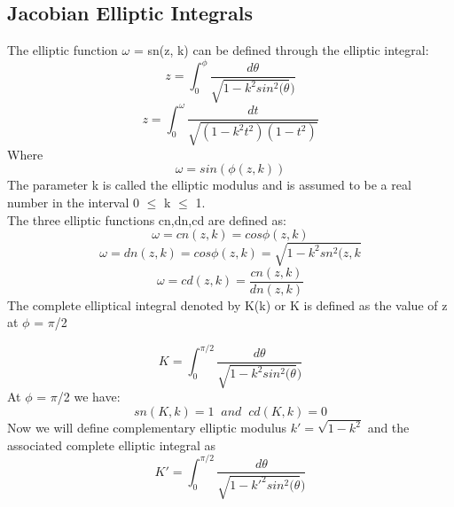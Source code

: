 \documentclass[12pt]{article}
\begin{document}
\subsection{\textbf{Jacobian Elliptic Integrals}}
The elliptic function $\omega$ = sn(z, k) can be defined through the elliptic integral:
\begin{equation*}
    z =  \int_{0}^{\phi} \frac{d\theta}{\sqrt{1-k^2sin^2(\theta})}
   
\end{equation*}
\begin{equation*}
     z =\int_{0}^{\omega} \frac{dt}{\sqrt{(1-k^2t^2)(1-t^2)}}
\end{equation*}
Where 
\begin{equation*}
    \omega = sin(\phi(z,k))
\end{equation*}
The parameter k is called the elliptic modulus and is assumed to be a real number
in the interval 0 $\leq$ k $\leq$ 1.\\
The three elliptic functions cn,dn,cd are defined as:
\begin{equation*}
    \omega = cn(z,k)= cos\phi(z,k)
\end{equation*}
\begin{equation*}
    \omega = dn(z,k)= cos\phi(z,k) = \sqrt{1-k^2sn^2(z,k}
\end{equation*}
\begin{equation*}
    \omega = cd(z,k)= \frac{cn(z,k)}{dn(z,k)}
\end{equation*}
The complete elliptical integral denoted by K(k) or K is defined as the value of z at $\phi$ = $\pi$/2


\begin{equation*}
    K =  \int_{0}^{\pi/2} \frac{d\theta}{\sqrt{1-k^2sin^2(\theta})}
\end{equation*}
At $\phi$ = $\pi$/2 we have:
\begin{equation*}
    sn(K,k) = 1 \;\;and\;\; cd(K,k) =0
\end{equation*}
Now we will define complementary elliptic modulus $k' = \sqrt{1-k^2}$ and the associated complete elliptic integral as
\begin{equation*}
    K' =  \int_{0}^{\pi/2} \frac{d\theta}{\sqrt{1-k'^2sin^2(\theta})}
\end{equation*}
\end{document}
